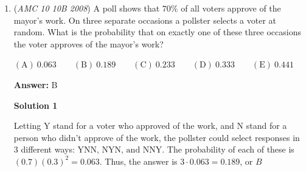 \begin{enumerate}
When rolling one or two dice, the probability of the sum being odd is equivalent to the probability of the sum being even. However, if we flip no heads, meaning we roll no dice, the sum is always even. Hence, the probability that the sum of the dice is even is ( 1 - the probability of flipping no heads ) / 2. Solving, we get that the answer is (1 - $\frac{1}{4}$) / 2 = $\frac{3}{8}$.

 


 


 



\textbf{Solution 4 (Very Fast)}

0 heads: If you are not rolling the dice, then it is an even number (0). 1 heads: If you are rolling 1 dice, the probability is 1/2, the same as odd. 2 heads: When you are rolling 2 dices, there are 2 choices for odd (O,E) (E,O) while there are also 2 choices for even (E,E) (O,O). In total, the chances of rolling an even is more than rolling an odd (More, Same, Same). So, the answer must be less than half and the only answer choice that satisfies this is answer choice (A).

 


 \begin{verbatim}
	~yanchudeng
\end{verbatim}




	\item (\textit{AMC 10 10B 2008}) A poll shows that $70\%$ of all voters approve of the mayor's work. On three separate occasions a pollster selects a voter at random. What is the probability that on exactly one of these three occasions the voter approves of the mayor's work?


 $\mathrm{(A)}\ {{{0.063}}} \qquad \mathrm{(B)}\ {{{0.189}}} \qquad \mathrm{(C)}\ {{{0.233}}} \qquad \mathrm{(D)}\ {{{0.333}}} \qquad \mathrm{(E)}\ {{{0.441}}}$

 \textbf{Answer: }B



\textbf{Solution 1}

Letting Y stand for a voter who approved of the work, and N stand for a person who didn't approve of the work, the pollster could select responses in $3$ different ways: $\text{YNN, NYN, and NNY}$. The probability of each of these is $(0.7)(0.3)^2=0.063$. Thus, the answer is $3\cdot0.063=0.189$, or $\boxed{B}$





\end{enumerate}
